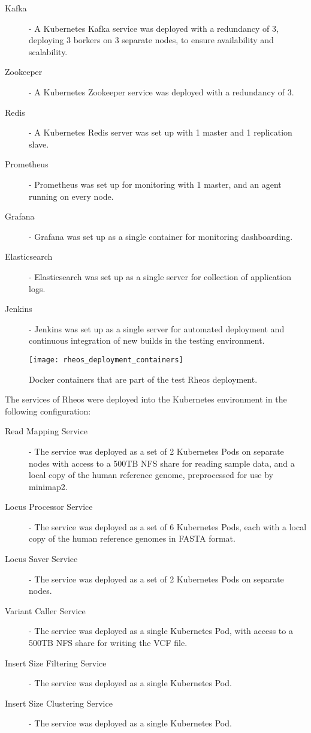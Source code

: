 \begin{description}
    \item [Kafka] - A Kubernetes Kafka service was deployed with a redundancy of 3, deploying 3 borkers on 3 separate nodes, to ensure availability and scalability.
    \item [Zookeeper] - A Kubernetes Zookeeper service was deployed with a redundancy of 3.
    \item [Redis] - A Kubernetes Redis server was set up with 1 master and 1 replication slave.
    \item [Prometheus] - Prometheus was set up for monitoring with 1 master, and an agent running on every node.
    \item [Grafana] - Grafana was set up as a single container for monitoring dashboarding.
    \item [Elasticsearch] - Elasticsearch was set up as a single server for collection of application logs.
    \item [Jenkins] - Jenkins was set up as a single server for automated deployment and continuous integration of new builds in the testing environment.
\end{description}

\begin{figure}[h!]
    \texttt{[image: rheos\_deployment\_containers]}
    \centering
    \caption {Docker containers that are part of the test Rheos deployment.}
    \label{fig:rheos_deployment_containers}
\end{figure}

The services of Rheos were deployed into the Kubernetes environment in the following configuration:

\begin{description}
    \item [Read Mapping Service] - The service was deployed as a set of 2 Kubernetes Pods on separate nodes with access to a 500TB NFS share for reading sample data, and a local copy of the human reference genome, preprocessed for use by minimap2.
    \item [Locus Processor Service] - The service was deployed as a set of 6 Kubernetes Pods, each with a local copy of the human reference genomes in FASTA format.
    \item [Locus Saver Service] - The service was deployed as a set of 2 Kubernetes Pods on separate nodes.
    \item [Variant Caller Service] - The service was deployed as a single Kubernetes Pod, with access to a 500TB NFS share for writing the VCF file.
    \item [Insert Size Filtering Service] - The service was deployed as a single Kubernetes Pod.
    \item [Insert Size Clustering Service] - The service was deployed as a single Kubernetes Pod.
\end{description}

